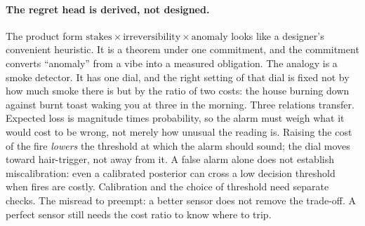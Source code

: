 \documentclass[11pt,a4paper]{article}
\theoremstyle{definition}
\theoremstyle{plain}
\begin{document}
\paragraph{The regret head is derived, not designed.} The product form
$\mathrm{stakes}\times\mathrm{irreversibility}\times\mathrm{anomaly}$ looks like a
designer's convenient heuristic. It is a theorem under one commitment, and the
commitment converts ``anomaly'' from a vibe into a measured obligation. The analogy
is a smoke detector. It has one dial, and the right setting of that dial is fixed
not by how much smoke there is but by the ratio of two costs: the house burning down
against burnt toast waking you at three in the morning. Three relations transfer.
Expected loss is magnitude times probability, so the alarm must weigh what it would
cost to be wrong, not merely how unusual the reading is. Raising the cost of the
fire \emph{lowers} the threshold at which the alarm should sound; the dial moves
toward hair-trigger, not away from it. A false alarm alone does not establish miscalibration: even a calibrated
posterior can cross a low decision threshold when fires are costly. Calibration
and the choice of threshold need separate checks. The misread to preempt: a better sensor does not remove
the trade-off. A perfect sensor still needs the cost ratio to know where to trip.
\end{document}
